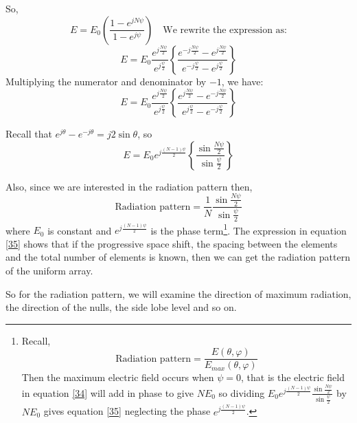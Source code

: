 So,
$$
E = E_0 \left(\frac{1-e^{jN\psi}}{1-e^{j\psi}}\right) \quad \text{We rewrite the expression as:}
$$
$$
E = E_0 \frac{e^{j\frac{N\psi}{2}}}{e^{j\frac{\psi}{2}}} \left\{\frac{e^{-j\frac{N\psi}{2}} - e^{j\frac{N\psi}{2}}}{e^{-j\frac{\psi}{2}} - e^{j\frac{\psi}{2}}}\right\}
$$
Multiplying the numerator and denominator by $-1$, we have:
$$
E = E_0 \frac{e^{j\frac{N\psi}{2}}}{e^{j\frac{\psi}{2}}} \left\{\frac{e^{j\frac{N\psi}{2}} - e^{-j\frac{N\psi}{2}}}{e^{j\frac{\psi}{2}} - e^{-j\frac{\psi}{2}}}\right\}
$$

Recall that $e^{j\theta} - e^{-j\theta} = j2\sin\theta$, so
$$
E = E_0e^{j\frac{(N-1)\psi}{2}} \left\{\frac{\sin{\frac{N\psi}{2}}}{\sin{\frac{\psi}{2}}}\right\}
$$

Also, since we are interested in the radiation pattern then, 
\begin{equation}
\label{35}
\text{Radiation pattern} = \frac{1}{N} \frac{\sin{\frac{N\psi}{2}}}{\sin{\frac{\psi}{2}}}
\end{equation}
where $E_0$ is constant and $e^{j\frac{(N-1)\psi}{2}}$ is the phase term\footnote{Recall, 
$$
\text{Radiation pattern} = \frac{E(\theta, \varphi)}{E_{max}(\theta, \varphi)}
$$
Then the maximum electric field occurs when $\psi = 0$, that is the electric field in equation \ref{34} will add in phase to give $NE_0$ so dividing $E_0e^{j\frac{(N-1)\psi}{2}} \frac{\sin{\frac{N\psi}{2}}}{\sin{\frac{\psi}{2}}}$ by  $NE_0$ gives equation \ref{35} neglecting the phase $e^{j\frac{(N-1)\psi}{2}}$.
}.
The expression in equation \ref{35} shows that if the progressive space shift, the spacing between the elements and the total number of elements is known, then we can get the radiation pattern of the uniform array. 

So for the radiation pattern, we will examine the direction of maximum radiation, the direction of the nulls, the side lobe level and so on.

